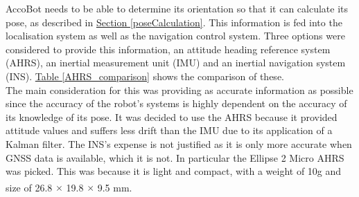 \documentclass[11pt]{article}		%
\newcommand{\supercite}[1]{\textsuperscript{\cite{#1}}}		%
\newcommand{\tableref}[1]{\hyperref[#1]{Table \ref*{#1}}}     %
\newcommand{\sectref}[1]{\hyperref[#1]{Section \ref*{#1}}}     %
\begin{document}
            AccoBot needs to be able to determine its orientation so that it can calculate its pose, as described in \sectref{poseCalculation}. This information is fed into the localisation system as well as the navigation control system. Three options were considered to provide this information, an attitude heading reference system (AHRS), an inertial measurement unit (IMU) and an inertial navigation system (INS). \tableref{AHRS_comparison} shows the comparison of these.
            \\
            \hspace*{2ex}The main consideration for this was providing as accurate information as possible since the accuracy of the robot’s systems is highly dependent on the accuracy of its knowledge of its pose. It was decided to use the AHRS because it provided attitude values and suffers less drift than the IMU due to its application of a Kalman filter. The INS's expense is not justified as it is only more accurate when GNSS data is available, which it is not. %
             In particular the Ellipse 2 Micro AHRS was picked. This was because it is light and compact, with a weight of 10g and size of 26.8 $\times$ 19.8 $\times$ 9.5 mm\supercite{Ellipse_Ahrs}.
\end{document}
